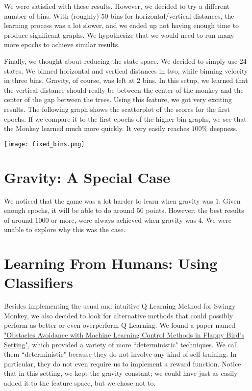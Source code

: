 \documentclass[10pt]{article}
\begin{document}
\medskip

We were satisfied with these results. However, we decided to try a different number
of bins. With (roughly) $50$ bins for horizontal/vertical distances, the learning process was a lot slower,
and we ended up not having enough time to produce significant graphs. We hypothesize that
we would need to run many more epochs to achieve similar results.

\medskip

Finally, we thought about reducing the state space. We decided to simply use
24 states. We binned horizontal and vertical distances in two, while binning
velocity in three bins. Gravity, of course, was left at $2$ bins. In this 
setup, we learned that the vertical distance should really be between the
center of the monkey and the center of the gap between the trees. Using this
feature, we got very exciting results. The following graph shows the scatterplot
of the scores for the first epochs. If we compare it to the first epochs of the
higher-bin graphs, we see that the Monkey learned much more quickly. It very
easily reaches $100\%$ deepness.

\medskip

\begin{center}
\texttt{[image: fixed\_bins.png]}
\end{center}

\medskip

\section{Gravity: A Special Case}

We noticed that the game was a lot harder to learn when gravity was $1$. Given
enough epochs, it will be able to do around $50$ points. However, the best
results of around $1000$ or more, were always achieved when gravity was $4$. We
were unable to explore why this was the case.

\section{Learning From Humans: Using Classifiers}

Besides implementing the usual and intuitive Q Learning Method for Swingy Monkey, 
we also decided to look for alternative methods that could possibly perform as 
better or even overperform Q Learning. We found a paper named \href{https://github.com/jereliu/Swingy-Monkey-AI/blob/master/Reference/Example\%20Work/Flappy\%20Birds.pdf}{"Obstacles Avoidance 
with Machine Learning Control Methods in Flappy Bird's Setting"}, which provided a 
variety of more ``deterministic" techniques. We call them ``deterministic" because
they do not involve any kind of self-training. In particular, they do not even 
require us to implement a reward function. Notice that in this setting,
we kept the gravity constant; we could have just as easily added it to the
feature space, but we chose not to.
\end{document}
